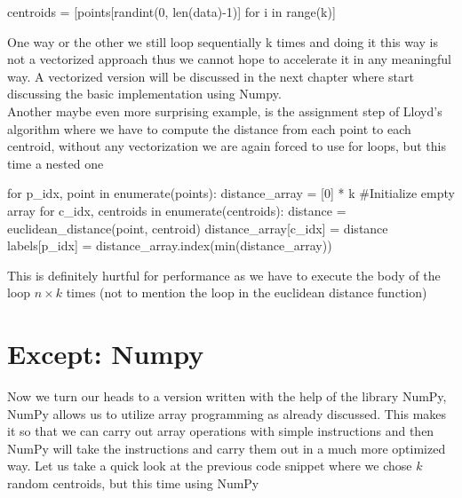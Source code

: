 \documentclass[12pt]{report}
\begin{document}
\begin{python}
centroids = [points[randint(0, len(data)-1)] for i in range(k)]
\end{python}

One way or the other we still loop sequentially k times and doing it this way is not a vectorized approach thus we cannot hope to accelerate it in any meaningful way. A vectorized version will be discussed in the next chapter where start discussing the basic implementation using Numpy. \\
Another maybe even more surprising example, is the assignment step of Lloyd's algorithm where we have to compute the distance from each point to each centroid, without any vectorization we are again forced to use for loops, but this time a nested one


\begin{python}[caption={Python example of calculating the distances between each centroid and each point. Lastly getting the label for each point for which centroid they belong to.}]
  for p_idx, point in enumerate(points):
      distance_array = [0] * k #Initialize empty array
      for c_idx, centroids in enumerate(centroids):
          distance = euclidean_distance(point, centroid)
          distance_array[c_idx] = distance
      labels[p_idx] = distance_array.index(min(distance_array))
\end{python}

This is definitely hurtful for performance as we have to execute the body of the loop $n \times k$ times (not to mention the loop in the euclidean distance function)



\newpage
\section{Except: Numpy}
\label{subsec:middle}
Now we turn our heads to a version written with the help of the library NumPy, NumPy allows us to utilize array programming as already discussed. This makes it so that we can carry out array operations with simple instructions and then NumPy will take the instructions and carry them out in a much more optimized way. Let us take a quick look at the previous code snippet where we chose $k$ random centroids, but this time using NumPy
\end{document}
